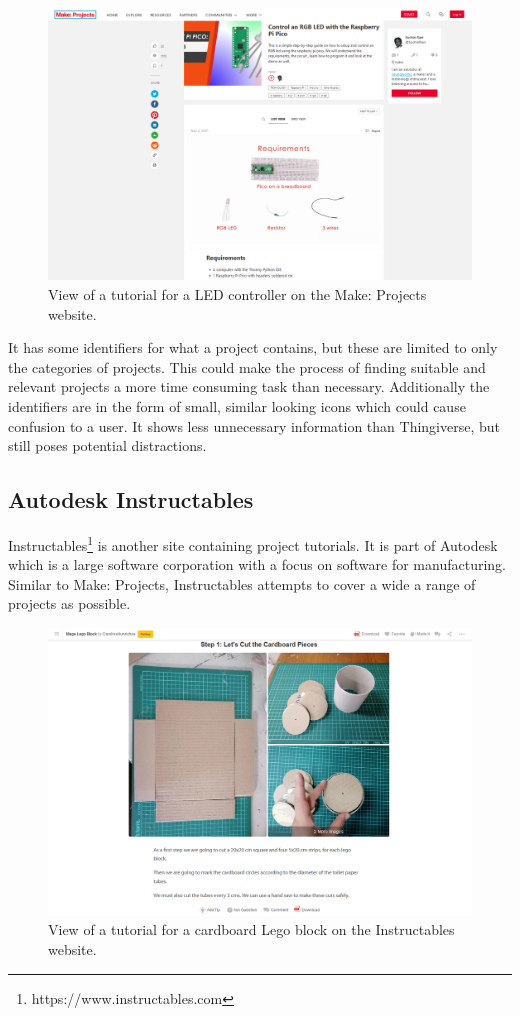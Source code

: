 \documentclass{l4proj}
\begin{document}
\begin{figure}[htb]
    \centering
    \includegraphics[width=0.75\linewidth]{images/make-projects.png}    

    \caption{View of a tutorial for a LED controller on the Make: Projects website.
    }
    \label{fig:make-projects} 
\end{figure}

It has some identifiers for what a project contains, but these are limited to only the categories of projects. This could make the process of finding suitable and relevant projects a more time consuming task than necessary. Additionally the identifiers are in the form of small, similar looking icons which could cause confusion to a user. It shows less unnecessary information than Thingiverse, but still poses potential distractions. 


\subsection{Autodesk Instructables}
Instructables\footnote{https://www.instructables.com} is another site containing project tutorials. It is part of Autodesk which is a large software corporation with a focus on software for manufacturing. Similar to Make: Projects, Instructables attempts to cover a wide a range of projects as possible. 
\clearpage 
\begin{figure}[htb]
    \centering
    \includegraphics[width=0.75\linewidth]{images/instructables.png}    

    \caption{View of a tutorial for a cardboard Lego block on the Instructables website.
    }
    \label{fig:instructables} 
\end{figure}
\end{document}
